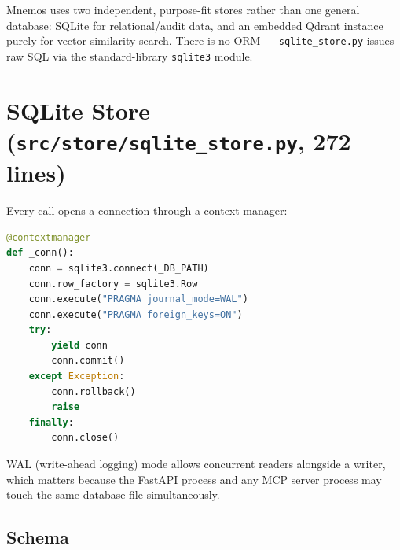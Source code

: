 \documentclass[11pt,a4paper]{report}
\newcommand{\code}[1]{\texttt{\small #1}}
\newcommand{\file}[1]{\texttt{\small\color{accent!70!black}#1}}
\begin{document}
Mnemos uses two independent, purpose-fit stores rather than one general database: SQLite for relational/audit data, and an embedded Qdrant instance purely for vector similarity search. There is no ORM — \file{sqlite\_store.py} issues raw SQL via the standard-library \code{sqlite3} module.

\section{SQLite Store (\file{src/store/sqlite\_store.py}, 272 lines)}

Every call opens a connection through a context manager:

\begin{lstlisting}[language=Python,caption={Connection handling}]
@contextmanager
def _conn():
    conn = sqlite3.connect(_DB_PATH)
    conn.row_factory = sqlite3.Row
    conn.execute("PRAGMA journal_mode=WAL")
    conn.execute("PRAGMA foreign_keys=ON")
    try:
        yield conn
        conn.commit()
    except Exception:
        conn.rollback()
        raise
    finally:
        conn.close()
\end{lstlisting}

WAL (write-ahead logging) mode allows concurrent readers alongside a writer, which matters because the FastAPI process and any MCP server process may touch the same database file simultaneously.

\subsection{Schema}
\end{document}
